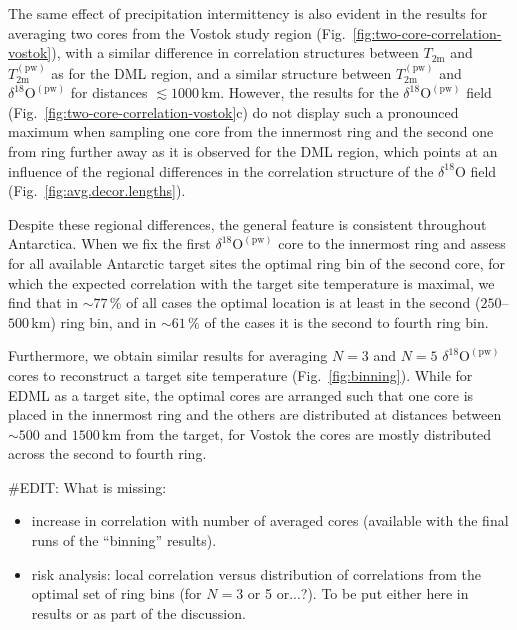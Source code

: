 \documentclass[cp, manuscript]{copernicus}
\begin{document}
The same effect of precipitation intermittency is also evident in the results
for averaging two cores from the Vostok study region
(Fig.~\ref{fig:two-core-correlation-vostok}), with a similar difference in
correlation structures between $T_{\mathrm{2m}}$ and
$T_{\mathrm{2m}}^{\mathrm{(pw)}}$ as for the DML region, and a similar structure
between $T_{\mathrm{2m}}^{\mathrm{(pw)}}$ and
$\delta^{18}\mathrm{O}^{\mathrm{(pw)}}$ for distances $\lesssim1000$\,km.
However, the results for the $\delta^{18}\mathrm{O}^{\mathrm{(pw)}}$ field
(Fig.~\ref{fig:two-core-correlation-vostok}c) do not display such a pronounced
maximum when sampling one core from the innermost ring and the second one from
ring further away as it is observed for the DML region, which points at an
influence of the regional differences in the correlation structure of the
$\delta^{18}\mathrm{O}$ field (Fig.~\ref{fig:avg.decor.lengths}).

Despite these regional differences, the general feature is consistent throughout
Antarctica. When we fix the first $\delta^{18}\mathrm{O}^{\mathrm{(pw)}}$ core
to the innermost ring and assess for all available Antarctic target sites the
optimal ring bin of the second core, for which the expected correlation with the
target site temperature is maximal, we find that in $\sim77\,\%$ of all cases
the optimal location is at least in the second ($250$--$500$\,km) ring bin, and
in $\sim61\,\%$ of the cases it is the second to fourth ring bin.

Furthermore, we obtain similar results for averaging $N=3$ and $N=5$
$\delta^{18}\mathrm{O}^{\mathrm{(pw)}}$ cores to reconstruct a target
site temperature (Fig.~\ref{fig:binning}). While for EDML as a target site, the
optimal cores are arranged such that one core is placed in the innermost ring
and the others are distributed at distances between $\sim500$ and $1500$\,km
from the target, for Vostok the cores are mostly distributed across the second
to fourth ring.

\noindent
\#EDIT: What is missing:
\begin{itemize}
\item increase in correlation with number of averaged cores (available with the
  final runs of the ``binning'' results).
\item risk analysis: local correlation versus distribution of correlations from
  the optimal set of ring bins (for $N=3$ or 5 or...?). To be put either here in
  results or as part of the discussion.
\end{itemize}
\end{document}
